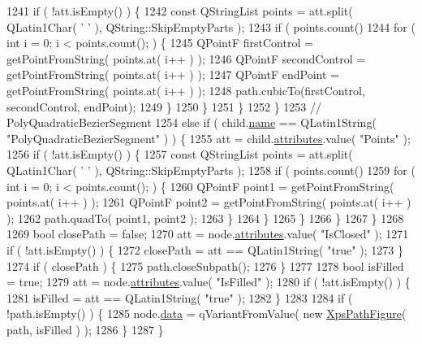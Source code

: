 \begin{DoxyCode}
1241             \textcolor{keywordflow}{if} ( !att.isEmpty() ) \{
1242                 \textcolor{keyword}{const} QStringList points = att.split( QLatin1Char( \textcolor{charliteral}{' '} ), QString::SkipEmptyParts );
1243                 \textcolor{keywordflow}{if} ( points.count() %
1244                     \textcolor{keywordflow}{for} ( \textcolor{keywordtype}{int} i = 0; i < points.count(); ) \{
1245                         QPointF firstControl = getPointFromString( points.at( i++ ) );
1246                         QPointF secondControl = getPointFromString( points.at( i++ ) );
1247                         QPointF endPoint = getPointFromString( points.at( i++ ) );
1248                         path.cubicTo(firstControl, secondControl, endPoint);
1249                     \}
1250                 \}
1251             \}
1252         \}
1253         \textcolor{comment}{// PolyQuadraticBezierSegment}
1254         \textcolor{keywordflow}{else} \textcolor{keywordflow}{if} ( child.\hyperlink{classXpsRenderNode_a7b3d33b9669c0235e095d5efc870ccf0}{name} == QLatin1String( \textcolor{stringliteral}{"PolyQuadraticBezierSegment"} ) ) \{
1255             att = child.\hyperlink{classXpsRenderNode_a7f6fca2e06dd119e7eb20139af6c8477}{attributes}.value( \textcolor{stringliteral}{"Points"} );
1256             \textcolor{keywordflow}{if} ( !att.isEmpty() ) \{
1257                 \textcolor{keyword}{const} QStringList points = att.split( QLatin1Char( \textcolor{charliteral}{' '} ), QString::SkipEmptyParts );
1258                 \textcolor{keywordflow}{if} ( points.count() %
1259                     \textcolor{keywordflow}{for} ( \textcolor{keywordtype}{int} i = 0; i < points.count(); ) \{
1260                         QPointF point1 = getPointFromString( points.at( i++ ) );
1261                         QPointF point2 = getPointFromString( points.at( i++ ) );
1262                         path.quadTo( point1, point2 );
1263                     \}
1264                 \}
1265             \}
1266         \}
1267     \}
1268 
1269     \textcolor{keywordtype}{bool} closePath = \textcolor{keyword}{false};
1270     att = node.\hyperlink{classXpsRenderNode_a7f6fca2e06dd119e7eb20139af6c8477}{attributes}.value( \textcolor{stringliteral}{"IsClosed"} );
1271     \textcolor{keywordflow}{if} ( !att.isEmpty() ) \{
1272         closePath = att == QLatin1String( \textcolor{stringliteral}{"true"} );
1273     \}
1274     \textcolor{keywordflow}{if} ( closePath ) \{
1275         path.closeSubpath();
1276     \}
1277 
1278     \textcolor{keywordtype}{bool} isFilled = \textcolor{keyword}{true};
1279     att = node.\hyperlink{classXpsRenderNode_a7f6fca2e06dd119e7eb20139af6c8477}{attributes}.value( \textcolor{stringliteral}{"IsFilled"} );
1280     \textcolor{keywordflow}{if} ( !att.isEmpty() ) \{
1281         isFilled = att == QLatin1String( \textcolor{stringliteral}{"true"} );
1282     \}
1283 
1284     \textcolor{keywordflow}{if} ( !path.isEmpty() ) \{
1285         node.\hyperlink{classXpsRenderNode_a1b07b9ac5eb86bec6d9f94ec5c855065}{data} = qVariantFromValue( \textcolor{keyword}{new} \hyperlink{structXpsPathFigure}{XpsPathFigure}( path, isFilled ) );
1286     \}
1287 \}
\end{DoxyCode}

